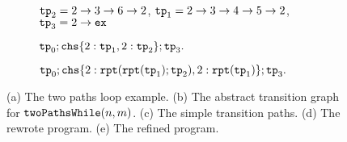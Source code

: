 {\begin{figure}
{\begin{subfigure}{.95\textwidth}
\begin{centering}
    $\mathtt{tp}_2 = 2 \to 3 \to 6 \to 2$, 
    $\mathtt{tp}_1 = 2 \to 3 \to 4 \to 5 \to 2$,
    $\mathtt{tp}_3 = 2 \to \mathtt{ex}$
    \caption{}
\end{centering}
\end{subfigure}
}
{
\begin{subfigure}{.4\textwidth}
\begin{centering}
$
\tpath_0; 
\rpchoose{ 2: \tpath_1, 2: \tpath_2 }; \tpath_3.
$
\caption{}
\end{centering}
\end{subfigure}
}
\begin{subfigure}{.5\textwidth}
  \begin{centering}
  $
  \tpath_0 ; 
  \rpchoose{2: \rprepeat(\rprepeat(\tpath_1); \tpath_2), 
  2: \rprepeat(\tpath_1)}; \tpath_3.
  $
  \caption{}
\end{centering}
  \end{subfigure}
\caption{
(a) The two paths loop example.
(b) The abstract transition graph for $\mathtt{twoPathsWhile}(n, m)$.
(c) The simple transition paths.
(d) The rewrote program.
(e) The refined program.}
    \label{fig:whileTwoCounters-refine}
\end{figure}
}
